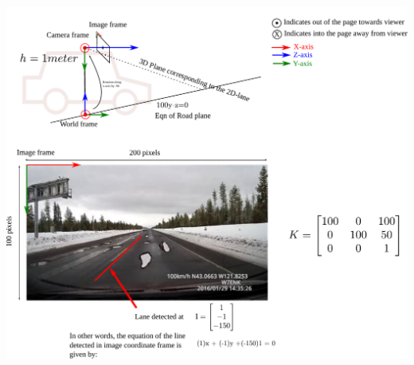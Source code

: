 \documentclass[times,t]{beamer}
\begin{document}
\begin{frame}
  \includegraphics[width=0.7\linewidth]{media/image-road-triangulation-line-plane.pdf}
\end{frame}
\end{document}
